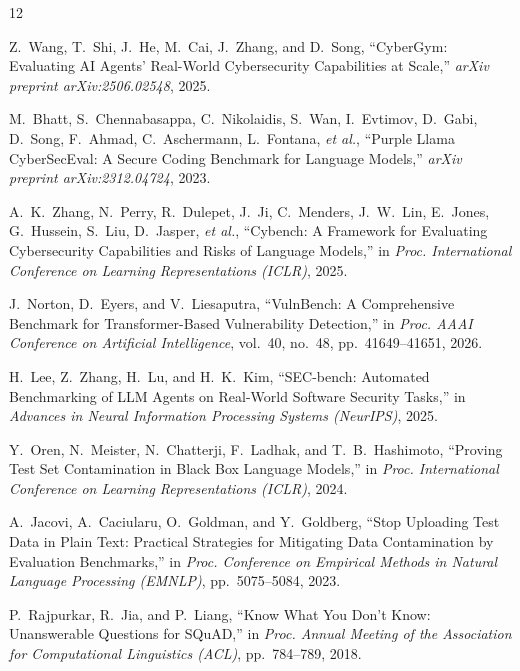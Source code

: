 \documentclass[conference]{IEEEtran}
\begin{document}

\begin{thebibliography}{12}

Z.~Wang, T.~Shi, J.~He, M.~Cai, J.~Zhang, and D.~Song, ``{CyberGym}: Evaluating {AI} Agents' Real-World Cybersecurity Capabilities at Scale,'' \emph{arXiv preprint arXiv:2506.02548}, 2025.

M.~Bhatt, S.~Chennabasappa, C.~Nikolaidis, S.~Wan, I.~Evtimov, D.~Gabi, D.~Song, F.~Ahmad, C.~Aschermann, L.~Fontana, \emph{et al.}, ``Purple Llama {CyberSecEval}: A Secure Coding Benchmark for Language Models,'' \emph{arXiv preprint arXiv:2312.04724}, 2023.

A.~K.~Zhang, N.~Perry, R.~Dulepet, J.~Ji, C.~Menders, J.~W.~Lin, E.~Jones, G.~Hussein, S.~Liu, D.~Jasper, \emph{et al.}, ``{Cybench}: A Framework for Evaluating Cybersecurity Capabilities and Risks of Language Models,'' in \emph{Proc. International Conference on Learning Representations (ICLR)}, 2025.

J.~Norton, D.~Eyers, and V.~Liesaputra, ``{VulnBench}: A Comprehensive Benchmark for Transformer-Based Vulnerability Detection,'' in \emph{Proc. AAAI Conference on Artificial Intelligence}, vol.~40, no.~48, pp.~41649--41651, 2026.

H.~Lee, Z.~Zhang, H.~Lu, and H.~K.~Kim, ``{SEC}-bench: Automated Benchmarking of {LLM} Agents on Real-World Software Security Tasks,'' in \emph{Advances in Neural Information Processing Systems (NeurIPS)}, 2025.

Y.~Oren, N.~Meister, N.~Chatterji, F.~Ladhak, and T.~B.~Hashimoto, ``Proving Test Set Contamination in Black Box Language Models,'' in \emph{Proc. International Conference on Learning Representations (ICLR)}, 2024.

A.~Jacovi, A.~Caciularu, O.~Goldman, and Y.~Goldberg, ``Stop Uploading Test Data in Plain Text: Practical Strategies for Mitigating Data Contamination by Evaluation Benchmarks,'' in \emph{Proc. Conference on Empirical Methods in Natural Language Processing (EMNLP)}, pp.~5075--5084, 2023.

P.~Rajpurkar, R.~Jia, and P.~Liang, ``Know What You Don't Know: Unanswerable Questions for {SQuAD},'' in \emph{Proc. Annual Meeting of the Association for Computational Linguistics (ACL)}, pp.~784--789, 2018.


\end{thebibliography}
\end{document}
